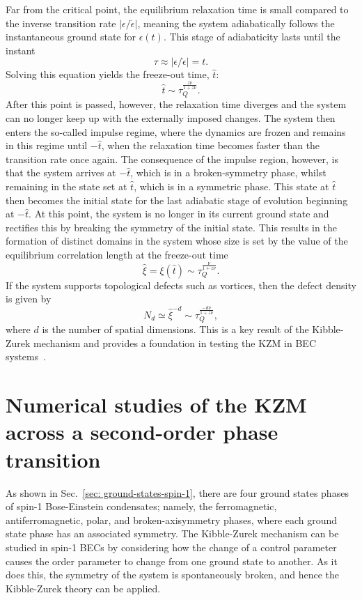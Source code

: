 Far from the critical point, the equilibrium relaxation time is small compared
to the inverse transition rate \( |\epsilon/\dot{\epsilon}| \), meaning the system
adiabatically follows the instantaneous ground state for \( \epsilon(t) \).
This stage of adiabaticity lasts until the instant
\begin{equation}
    \tau \approx |\epsilon/\dot{\epsilon}|=t.
    \label{eq: freeze-out-equal}
\end{equation}
Solving this equation yields the freeze-out time, \( \hat{t} \):
\begin{equation}
    \hat{t} \sim \tau_Q^\frac{z\nu}{1 + z\nu}.
    \label{eq: freeze-out-scaling}
\end{equation}
After this point is passed, however, the relaxation time diverges and the system
can no longer keep up with the externally imposed changes.
The system then enters the so-called impulse regime, where the dynamics are
frozen and remains in this regime until \( -\hat{t} \), when the relaxation
time becomes faster than the transition rate once again.
The consequence of the impulse region, however, is that the system arrives at
\( -\hat{t} \), which is in a broken-symmetry phase, whilst remaining
in the state set at \( \hat{t} \), which is in a symmetric phase.
This state at \( \hat{t} \) then becomes the initial state for the last adiabatic
stage of evolution beginning at \( -\hat{t} \).
At this point, the system is no longer in its current ground state and rectifies
this by breaking the symmetry of the initial state.
This results in the formation of distinct domains in the system whose size is
set by the value of the equilibrium correlation length at the freeze-out time
\begin{equation}
    \hat{\xi}=\xi(\hat{t}) \sim \tau_Q^{\frac{\nu}{1 + z\nu}}.
    \label{eq: KZM-domain-size}
\end{equation}
If the system supports topological defects such as vortices, then the defect
density is given by
\begin{equation}\label{eq: KZM-defects-scaling}
    N_d \simeq \hat{\xi}^{-d} \sim \tau_Q^{\frac{-d\nu}{1+z\nu}},
\end{equation}
where \( d \) is the number of spatial dimensions.
This is a key result of the Kibble-Zurek mechanism and provides a
foundation in testing the KZM in BEC systems~\cite{Damski2007, Swislocki2013,
    Anquez2016, Saito2007, Saito2007a}.

\section{Numerical studies of the KZM across a second-order phase transition}
As shown in Sec.~\ref{sec: ground-states-spin-1}, there are four ground states
phases of spin-1 Bose-Einstein condensates; namely, the ferromagnetic,
antiferromagnetic, polar, and broken-axisymmetry phases, where each ground
state phase has an associated symmetry.
The Kibble-Zurek mechanism can be studied in spin-1 BECs by considering how
the change of a control parameter causes the order parameter to change from
one ground state to another.
As it does this, the symmetry of the system is spontaneously broken, and hence
the Kibble-Zurek theory can be applied.

